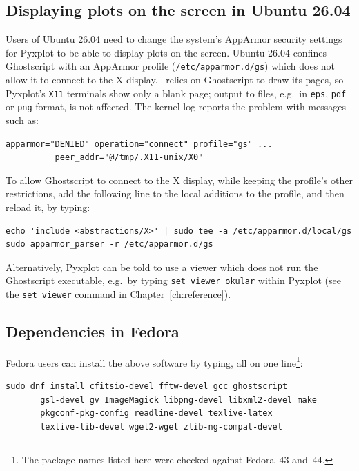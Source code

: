 \subsection{Displaying plots on the screen in Ubuntu 26.04}

Users of Ubuntu 26.04 need to change the system's AppArmor security settings
for Pyxplot to be able to display plots on the screen. Ubuntu 26.04 confines
Ghostscript with an AppArmor profile ({\tt /etc/apparmor.d/gs}) which does not
allow it to connect to the X display. \ghostview\ relies on Ghostscript to draw
its pages, so Pyxplot's {\tt X11} terminals show only a blank page; output to
files, e.g.\ in {\tt eps}, {\tt pdf} or {\tt png} format, is not affected. The
kernel log reports the problem with messages such as:

\begin{verbatim}
apparmor="DENIED" operation="connect" profile="gs" ...
          peer_addr="@/tmp/.X11-unix/X0"
\end{verbatim}

\noindent To allow Ghostscript to connect to the X display, while keeping the
profile's other restrictions, add the following line to the local additions to
the profile, and then reload it, by typing:

\begin{verbatim}
echo 'include <abstractions/X>' | sudo tee -a /etc/apparmor.d/local/gs
sudo apparmor_parser -r /etc/apparmor.d/gs
\end{verbatim}

\noindent Alternatively, Pyxplot can be told to use a viewer which does not run
the Ghostscript executable, e.g.\ by typing {\tt set viewer okular} within
Pyxplot (see the {\tt set viewer} command in Chapter~\ref{ch:reference}).

\subsection{Dependencies in Fedora}

Fedora users can install the above software by typing, all on one
line\footnote{The package names listed here were checked against Fedora~43
and~44.}:

\begin{verbatim}
sudo dnf install cfitsio-devel fftw-devel gcc ghostscript
       gsl-devel gv ImageMagick libpng-devel libxml2-devel make
       pkgconf-pkg-config readline-devel texlive-latex
       texlive-lib-devel wget2-wget zlib-ng-compat-devel
\end{verbatim}

